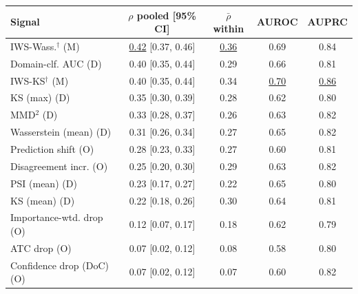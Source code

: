 \begin{tabular}{lcccc}
\toprule
Signal & $\rho$ pooled [95\% CI] & $\bar\rho$ within & AUROC & AUPRC \\
\midrule
IWS-Wass.$^\dagger$ (M) & \underline{0.42} [0.37, 0.46] & \underline{0.36} & 0.69 & 0.84 \\
Domain-clf. AUC (D) & 0.40 [0.35, 0.44] & 0.29 & 0.66 & 0.81 \\
IWS-KS$^\dagger$ (M) & 0.40 [0.35, 0.44] & 0.34 & \underline{0.70} & \underline{0.86} \\
KS (max) (D) & 0.35 [0.30, 0.39] & 0.28 & 0.62 & 0.80 \\
MMD$^2$ (D) & 0.33 [0.28, 0.37] & 0.26 & 0.63 & 0.82 \\
Wasserstein (mean) (D) & 0.31 [0.26, 0.34] & 0.27 & 0.65 & 0.82 \\
Prediction shift (O) & 0.28 [0.23, 0.33] & 0.27 & 0.60 & 0.81 \\
Disagreement incr. (O) & 0.25 [0.20, 0.30] & 0.29 & 0.63 & 0.82 \\
PSI (mean) (D) & 0.23 [0.17, 0.27] & 0.22 & 0.65 & 0.80 \\
KS (mean) (D) & 0.22 [0.18, 0.26] & 0.30 & 0.64 & 0.81 \\
Importance-wtd. drop (O) & 0.12 [0.07, 0.17] & 0.18 & 0.62 & 0.79 \\
ATC drop (O) & 0.07 [0.02, 0.12] & 0.08 & 0.58 & 0.80 \\
Confidence drop (DoC) (O) & 0.07 [0.02, 0.12] & 0.07 & 0.60 & 0.82 \\
\bottomrule
\end{tabular}